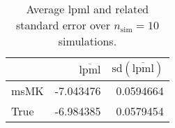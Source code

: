 \begin{table}[H]

\caption{Average lpml and related standard error over $n_{\text{sim}} = 10$ simulations.}
\centering
\begin{tabular}[t]{lrr}
\toprule
  & $\overbar{\text{lpml}}$ & $\text{sd}(\overbar{\text{lpml}})$\\
\midrule
msMK & -7.043476 & 0.0594664\\
True & -6.984385 & 0.0579454\\
\bottomrule
\end{tabular}
\end{table}